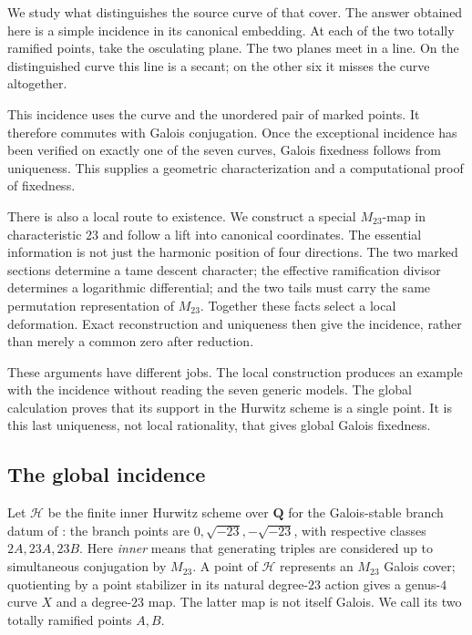 \documentclass[11pt]{amsart}
\theoremstyle{definition}
\theoremstyle{remark}
\newcommand{\QQ}{\mathbf Q}
\begin{document}
We study what distinguishes the source curve of that cover.
The answer obtained here is a simple incidence in its canonical
embedding.  At each of the two totally ramified points, take the
osculating plane.  The two planes meet in a line.  On the distinguished
curve this line is a secant; on the other six it misses the curve
altogether.

This incidence uses the curve and the unordered pair of marked points.
It therefore commutes with Galois conjugation.  Once the exceptional
incidence has been verified on exactly one of the seven curves,
Galois fixedness follows from uniqueness.  This supplies a geometric
characterization and a computational proof of fixedness.

There is also a local route to existence.  We construct a special
$M_{23}$-map in characteristic $23$ and follow a lift into canonical
coordinates.  The essential information is not just the harmonic
position of four directions.  The two marked sections determine a
tame descent character; the effective ramification divisor determines
a logarithmic differential; and the two tails must carry the same
permutation representation of $M_{23}$.  Together these facts select
a local deformation.  Exact reconstruction and uniqueness then give
the incidence, rather than merely a common zero after reduction.

These arguments have different jobs.  The local construction produces
an example with the incidence without reading the seven generic models.
The global calculation proves that its support in the Hurwitz scheme
is a single point.  It is this last uniqueness, not local rationality,
that gives global Galois fixedness.

\subsection{The global incidence}

Let $\mathcal H$ be the finite inner Hurwitz scheme over $\QQ$ for the
Galois-stable branch datum of \cite{HJLPPZ}: the branch points are
$0,\sqrt{-23},-\sqrt{-23}$, with respective classes $2A,23A,23B$.
Here \emph{inner} means that generating triples are considered up to
simultaneous conjugation by $M_{23}$.  A point of $\mathcal H$ represents
an $M_{23}$ Galois cover; quotienting by a point stabilizer in its natural
degree-$23$ action gives a genus-$4$ curve $X$ and a degree-$23$ map.
The latter map is not itself Galois.  We call its two totally ramified
points $A,B$.
\end{document}
